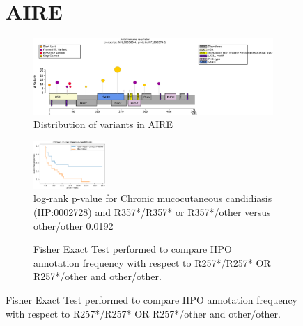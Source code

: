\begin{figure}[htbp]
\section*{AIRE}
\centering
\begin{subfigure}[b]{0.95\textwidth}
\centering
\includegraphics[width=\textwidth]{ img/AIRE_protein_diagram.pdf} 
\captionsetup{justification=raggedright,singlelinecheck=false}
\caption{Distribution of variants in AIRE}
\end{subfigure}

\vspace{2em}

\begin{subfigure}[b]{0.95\textwidth}
\centering
\includegraphics[width=0.3\textwidth]{ img/AIRE_cmc.pdf} 
\captionsetup{justification=raggedright,singlelinecheck=false}
\caption{log-rank p-value for Chronic mucocutaneous candidiasis (HP:0002728) and R357*/R357* or R357*/other versus other/other 0.0192}
\end{subfigure}
    
\vspace{2em}

\begin{subfigure}[b]{0.95\textwidth}
\centering
{}
\captionsetup{justification=raggedright,singlelinecheck=false}
\caption{Fisher Exact Test performed to compare HPO annotation frequency with respect to R257*/R257* OR R257*/other and other/other. }
\end{subfigure}


\end{figure}
